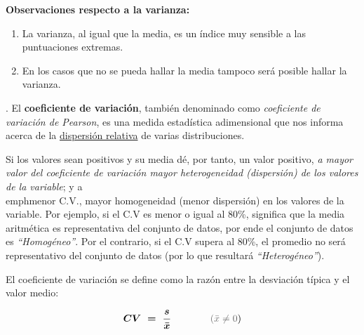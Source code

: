 \textbf{Observaciones respecto a la varianza:}

\begin{enumerate}[1. ]
\item La varianza, al igual que la media, es un índice muy sensible a las puntuaciones extremas.
 
\item En los casos que no se pueda hallar la media tampoco será posible hallar la varianza.
\end{enumerate}

\vspace{5mm}%
\begin{definition}
. El \textbf{coeficiente de variación}, también denominado como \emph{coeficiente de variación de Pearson}, es una medida estadística adimensional que nos informa acerca de la \underline{dispersión relativa} de varias distribuciones.	

\vspace{2mm} Si los valores sean positivos y su media dé, por tanto, un valor positivo, \emph{a mayor valor del coeficiente de variación mayor heterogeneidad (dispersión) de los valores de la variable}; y a \\emph{menor C.V., mayor homogeneidad (menor dispersión) en los valores de la variable}. Por ejemplo, si el C.V es menor o igual al 80\%, significa que la media aritmética es representativa del conjunto de datos, por ende el conjunto de datos es \emph{``Homogéneo''}. Por el contrario, si el C.V supera al 80\%, el promedio no será representativo del conjunto de datos (por lo que resultará \emph{``Heterogéneo''}). 

\vspace{2mm} El coeficiente de variación se define como la razón entre la desviación típica y el valor medio:

$$\boldsymbol{ CV \ = \ 	\dfrac {s}{\bar x}} \qquad \qquad\textcolor{gris}{(\bar x \neq 0})$$
\end{definition}

